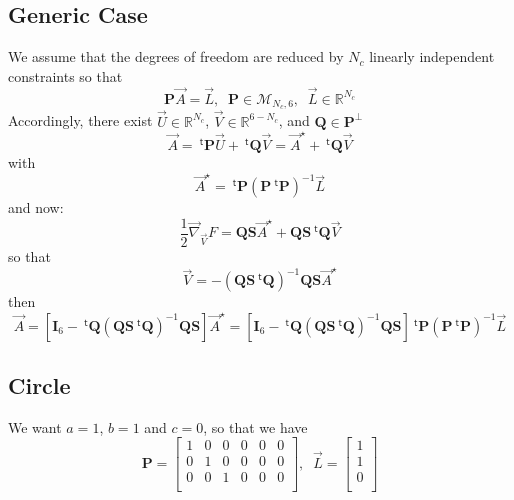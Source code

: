 \documentclass[aps]{revtex4}
\newcommand{\mymat}[1]{\boldsymbol{#1}}
\newcommand{\mytrn}[1]{~^{\mathsf{t}}\!{#1}}
\newcommand{\mygrad}{\vec{\nabla}}
\begin{document}
\subsection{Generic Case}
We assume that the degrees of freedom are reduced by $N_c$ linearly independent constraints  so that
\begin{equation}
	\mymat{P} \vec{A} = \vec{L},\;\;\mymat{P}\in\mathcal{M}_{N_c,6}, \;\; \vec{L} \in \mathbb{R}^{N_c}
\end{equation}
Accordingly, there exist $\vec{U}\in\mathbb{R}^{N_c}$, $\vec{V}\in\mathbb{R}^{6-N_c}$, and $\mymat{Q}\in\mymat{P}^{\perp}$
\begin{equation}
	\vec{A} = \mytrn{\mymat{P}} \vec{U} + \mytrn{\mymat{Q}} \vec{V} = \vec{A}^\star  + \mytrn{\mymat{Q}} \vec{V} 
\end{equation}
with
\begin{equation}
	\vec{A}^\star = \mytrn{\mymat{P}} \left(\mymat{P} \mytrn{\mymat{P}} \right) ^{-1} \vec{L}
\end{equation}
and now:
\begin{equation}
	\frac{1}{2} \mygrad_{\vec{V}} F = \mymat{Q}\mymat{S} \vec{A}^\star +  \mymat{Q}\mymat{S}\mytrn{\mymat{Q}} \vec{V}
\end{equation}
so that
\begin{equation}
	\vec{V} = - \left(\mymat{Q}\mymat{S}\mytrn{\mymat{Q}}\right)^{-1} \mymat{Q}\mymat{S} \vec{A}^\star 
\end{equation}
then
\begin{equation}
	\vec{A} = \left[\mymat{I}_6 -  \mytrn{\mymat{Q}}\left(\mymat{Q}\mymat{S}\mytrn{\mymat{Q}}\right)^{-1} \mymat{Q}\mymat{S} \right] \vec{A}^\star
	= \left[\mymat{I}_6 -  \mytrn{\mymat{Q}}\left(\mymat{Q}\mymat{S}\mytrn{\mymat{Q}}\right)^{-1} \mymat{Q}\mymat{S} \right] \mytrn{\mymat{P}} \left(\mymat{P} \mytrn{\mymat{P}} \right) ^{-1} \vec{L}
\end{equation}
\subsection{Circle}
We want $a=1$, $b=1$ and $c=0$, so that we have
\begin{equation}
	\mymat{P} = 
	\begin{bmatrix}
	1 & 0 & 0 & 0 & 0 & 0\\
	0 & 1 & 0 & 0 & 0 & 0\\
	0 & 0 & 1 & 0 & 0 & 0\\
	\end{bmatrix},
	\;\;
	\vec{L} = 
	\begin{bmatrix}
	1\\
	1\\
	0\\
	\end{bmatrix}
\end{equation}
\end{document}
